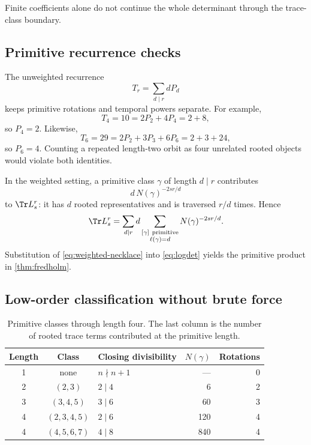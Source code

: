 Finite coefficients alone do not continue the whole determinant through the
trace-class boundary.

\subsection{Primitive recurrence checks}

The unweighted recurrence
\[
 T_r=\sum_{d\mid r}dP_d
\]
keeps primitive rotations and temporal powers separate.  For example,
\[
 T_4=10=2P_2+4P_4=2+8,
\]
so \(P_4=2\).  Likewise,
\[
 T_6=29=2P_2+3P_3+6P_6=2+3+24,
\]
so \(P_6=4\).  Counting a repeated length-two orbit as four unrelated rooted
objects would violate both identities.

In the weighted setting, a primitive class \(\gamma\) of length \(d\mid r\)
contributes
\[
 d\,N(\gamma)^{-2sr/d}
\]
to \(\Tr L_s^r\): it has \(d\) rooted representatives and is traversed
\(r/d\) times.  Hence
\begin{equation}
\label{eq:weighted-necklace}
 \Tr L_s^r
 =
 \sum_{d\mid r}d
 \sum_{\substack{[\gamma]\ {\rm primitive}\\\ell(\gamma)=d}}
 N(\gamma)^{-2sr/d}.
\end{equation}
Substitution of \cref{eq:weighted-necklace} into \cref{eq:logdet} yields the
primitive product in \cref{thm:fredholm}.

\subsection{Low-order classification without brute force}

\begin{table}[ht]
\centering
\small
\caption{Primitive classes through length four.  The last column is the
number of rooted trace terms contributed at the primitive length.}
\label{tab:low-classes}
\begin{tabular}{@{}cclrr@{}}
\toprule
Length & Class & Closing divisibility & \(N(\gamma)\) & Rotations\\
\midrule
1 & none & \(n\nmid n+1\) & --- & 0\\
2 & \((2,3)\) & \(2\mid4\) & 6 & 2\\
3 & \((3,4,5)\) & \(3\mid6\) & 60 & 3\\
4 & \((2,3,4,5)\) & \(2\mid6\) & 120 & 4\\
4 & \((4,5,6,7)\) & \(4\mid8\) & 840 & 4\\
\bottomrule
\end{tabular}
\end{table}

